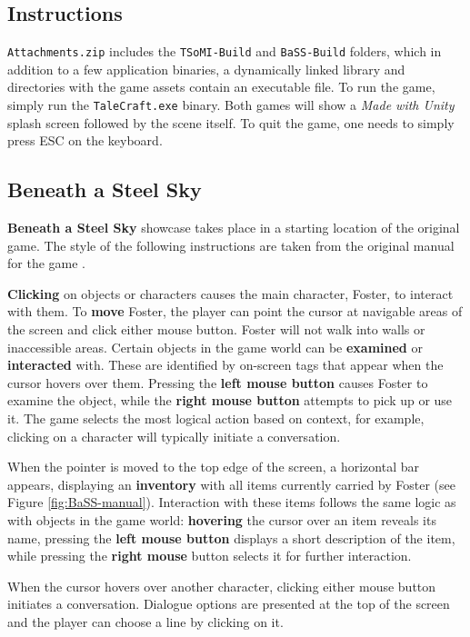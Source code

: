 \subsection{Instructions}
\verb|Attachments.zip| includes the \verb|TSoMI-Build| and \verb|BaSS-Build| folders, which in addition to a few application binaries, a dynamically linked library and directories with the game assets contain an executable file. To run the game, simply run the \verb|TaleCraft.exe| binary. Both games will show a \textit{Made with Unity }splash screen followed by the scene itself. To quit the game, one needs to simply press ESC on the keyboard.

\subsection{Beneath a Steel Sky}
\textbf{Beneath a Steel Sky} showcase takes place in a starting location of the original game. The style of the following instructions are taken from the original manual for the game \cite{BaSS-Manual}.

\textbf{Clicking} on objects or characters causes the main character, Foster, to interact with them. To \textbf{move} Foster, the player can point the cursor at navigable areas of the screen and click either mouse button. Foster will not walk into walls or inaccessible areas. Certain objects in the game world can be \textbf{examined} or \textbf{interacted} with. These are identified by on-screen tags that appear when the cursor hovers over them. Pressing the \textbf{left mouse button} causes Foster to examine the object, while the \textbf{right mouse button} attempts to pick up or use it. The game selects the most logical action based on context, for example, clicking on a character will typically initiate a conversation. 

When the pointer is moved to the top edge of the screen, a horizontal bar appears, displaying an \textbf{inventory} with all items currently carried by Foster (see Figure \ref{fig:BaSS-manual}). Interaction with these items follows the same logic as with objects in the game world: \textbf{hovering} the cursor over an item reveals its name, pressing the \textbf{left mouse button} displays a short description of the item, while pressing the \textbf{right mouse} button selects it for further interaction. 

When the cursor hovers over another character, clicking either mouse button initiates a conversation. Dialogue options are presented at the top of the screen and the player can choose a line by clicking on it. 

